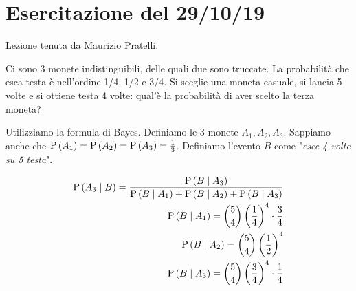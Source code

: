 \section{Esercitazione del 29/10/19}

Lezione tenuta da Maurizio Pratelli.

\begin{exrc}
    Ci sono 3 monete indistinguibili, delle quali due sono truccate.
    La probabilit\`a che esca testa \`e nell'ordine 1/4, 1/2 e 3/4.
    Si sceglie una moneta casuale, si lancia 5 volte e si ottiene testa 4 volte: qual'\`e la probabilit\`a di aver scelto la terza moneta?

    Utilizziamo la formula di Bayes. Definiamo le 3 monete $A_1, A_2, A_3$. Sappiamo anche che $ \text{P}\left(A_1\right) = \text{P}\left(A_2\right) = \text{P}\left(A_3\right) = \frac{1}{3} $. Definiamo l'evento $ B $ come "\textit{esce 4 volte su 5 testa}".

    \begin{equation*}
        \begin{aligned}
            \text{P}\left(A_3 \mid B\right) = \dfrac{\text{P}\left(B \mid A_3\right)}{\text{P}\left(B \mid A_1\right) + \text{P}\left(B \mid A_2\right) + \text{P}\left(B \mid A_3\right)} \\
            \text{P}\left(B \mid A_1\right) = \binom{5}{4} \left(\dfrac{1}{4}\right)^4 \cdot \dfrac{3}{4}\\
            \text{P}\left(B \mid A_2\right) = \binom{5}{4} \left(\dfrac{1}{2}\right)^4 \\
            \text{P}\left(B \mid A_3\right) = \binom{5}{4} \left(\dfrac{3}{4}\right)^4 \cdot \dfrac{1}{4}\\
        \end{aligned}
    \end{equation*}
\end{exrc}

